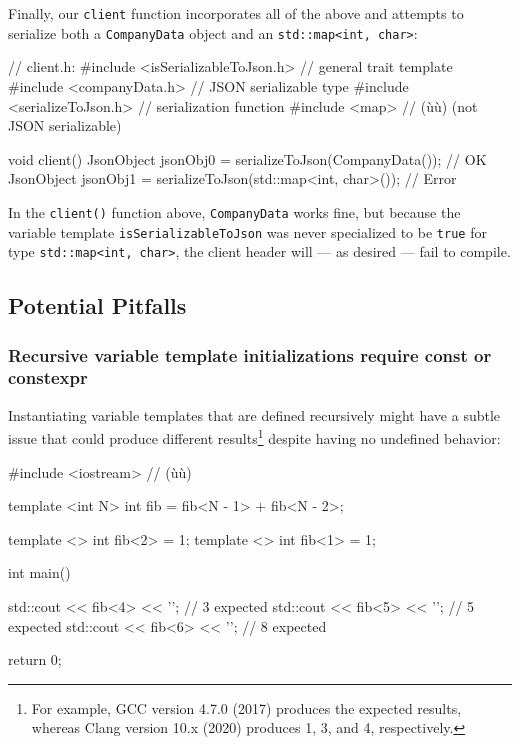 \noindent Finally, our \lstinline!client! function incorporates all of the above and
attempts to serialize both a \lstinline!CompanyData! object and an
\lstinline!std::map<int,!~\lstinline!char>!:

\enlargethispage*{-22ex}
\begin{emcppslisting}[emcppsbatch=e6]
// client.h:
#include <isSerializableToJson.h>  // general trait template
#include <companyData.h>           // JSON serializable type
#include <serializeToJson.h>       // serialization function
#include <map>                     // (ù{}ù) (not JSON serializable)

void client()
{
    JsonObject jsonObj0 = serializeToJson(CompanyData());          // OK
    JsonObject jsonObj1 = serializeToJson(std::map<int, char>());  // Error
}
\end{emcppslisting}


\noindent In the \lstinline!client()! function above, \lstinline!CompanyData! works
fine, but because the variable template \lstinline!isSerializableToJson!
was never specialized to be \lstinline!true! for type
\mbox{\lstinline!std::map<int,! \lstinline!char>!}, the client header will --- as
desired --- fail to compile.

\subsection[Potential Pitfalls]{Potential Pitfalls}\label{variabletemplate-potential-pitfalls}

\subsubsection[Recursive variable template initializations require \lstinline!const! or \lstinline!constexpr!]{Recursive variable template initializations require {\SubsubsecCode const} or {\SubsubsecCode constexpr}}\label{recursive-variable-template-initializations-require-const-or-constexpr}

Instantiating variable templates that are defined recursively might have a subtle issue that could produce different results{\cprotect\footnote{For
example, GCC version 4.7.0 (2017) produces the expected results, whereas
  Clang version 10.x (2020) produces 1, 3, and 4, respectively.}} despite having no undefined behavior:

\begin{emcppslisting}
#include <iostream>  // (ù{}ù)

template <int N>
int fib = fib<N - 1> + fib<N - 2>;

template <> int fib<2> = 1;
template <> int fib<1> = 1;

int main()
{
    std::cout << fib<4> << '\n';  // 3 expected
    std::cout << fib<5> << '\n';  // 5 expected
    std::cout << fib<6> << '\n';  // 8 expected

    return 0;
}
\end{emcppslisting}

